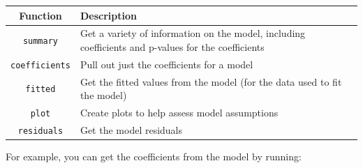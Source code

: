 \documentclass[]{book}
\theoremstyle{definition}
\theoremstyle{definition}
\theoremstyle{definition}
\theoremstyle{remark}
\begin{document}
\begin{longtable}[]{@{}cl@{}}
\toprule
\begin{minipage}[b]{0.21\columnwidth}\centering\strut
Function\strut
\end{minipage} & \begin{minipage}[b]{0.73\columnwidth}\raggedright\strut
Description\strut
\end{minipage}\tabularnewline
\midrule
\endhead
\begin{minipage}[t]{0.21\columnwidth}\centering\strut
\texttt{summary}\strut
\end{minipage} & \begin{minipage}[t]{0.73\columnwidth}\raggedright\strut
Get a variety of information on the model, including coefficients and
p-values for the coefficients\strut
\end{minipage}\tabularnewline
\begin{minipage}[t]{0.21\columnwidth}\centering\strut
\texttt{coefficients}\strut
\end{minipage} & \begin{minipage}[t]{0.73\columnwidth}\raggedright\strut
Pull out just the coefficients for a model\strut
\end{minipage}\tabularnewline
\begin{minipage}[t]{0.21\columnwidth}\centering\strut
\texttt{fitted}\strut
\end{minipage} & \begin{minipage}[t]{0.73\columnwidth}\raggedright\strut
Get the fitted values from the model (for the data used to fit the
model)\strut
\end{minipage}\tabularnewline
\begin{minipage}[t]{0.21\columnwidth}\centering\strut
\texttt{plot}\strut
\end{minipage} & \begin{minipage}[t]{0.73\columnwidth}\raggedright\strut
Create plots to help assess model assumptions\strut
\end{minipage}\tabularnewline
\begin{minipage}[t]{0.21\columnwidth}\centering\strut
\texttt{residuals}\strut
\end{minipage} & \begin{minipage}[t]{0.73\columnwidth}\raggedright\strut
Get the model residuals\strut
\end{minipage}\tabularnewline
\bottomrule
\end{longtable}

For example, you can get the coefficients from the model by running:
\end{document}
